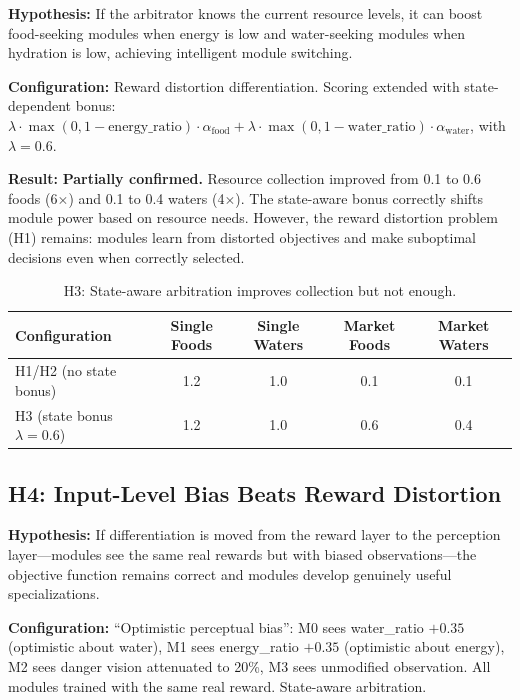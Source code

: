 \documentclass[a4paper,11pt]{article}
\begin{document}
\textbf{Hypothesis:} If the arbitrator knows the current resource levels, it can boost food-seeking modules when energy is low and water-seeking modules when hydration is low, achieving intelligent module switching.

\textbf{Configuration:} Reward distortion differentiation. Scoring extended with state-dependent bonus: $\lambda \cdot \max(0, 1 - \text{energy\_ratio}) \cdot \alpha_{\text{food}} + \lambda \cdot \max(0, 1 - \text{water\_ratio}) \cdot \alpha_{\text{water}}$, with $\lambda = 0.6$.

\textbf{Result:} \textbf{Partially confirmed.} Resource collection improved from 0.1 to 0.6 foods (6$\times$) and 0.1 to 0.4 waters (4$\times$). The state-aware bonus correctly shifts module power based on resource needs. However, the reward distortion problem (H1) remains: modules learn from distorted objectives and make suboptimal decisions even when correctly selected.

\begin{table}[H]
\centering
\caption{H3: State-aware arbitration improves collection but not enough.}
\label{tab:h3}
\begin{tabular}{lcccc}
\toprule
\textbf{Configuration} & \textbf{Single Foods} & \textbf{Single Waters} & \textbf{Market Foods} & \textbf{Market Waters} \\
\midrule
H1/H2 (no state bonus) & 1.2 & 1.0 & 0.1 & 0.1 \\
H3 (state bonus $\lambda{=}0.6$) & 1.2 & 1.0 & 0.6 & 0.4 \\
\bottomrule
\end{tabular}
\end{table}

\subsection{H4: Input-Level Bias Beats Reward Distortion}

\textbf{Hypothesis:} If differentiation is moved from the reward layer to the perception layer---modules see the same real rewards but with biased observations---the objective function remains correct and modules develop genuinely useful specializations.

\textbf{Configuration:} ``Optimistic perceptual bias'': M0 sees water\_ratio $+0.35$ (optimistic about water), M1 sees energy\_ratio $+0.35$ (optimistic about energy), M2 sees danger vision attenuated to 20\%, M3 sees unmodified observation. All modules trained with the same real reward. State-aware arbitration.
\end{document}
